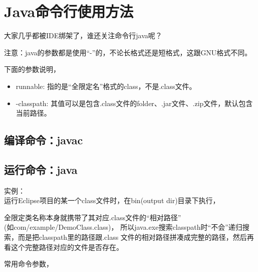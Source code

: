 ﻿\section[Java命令行使用方法]{Java命令行使用方法}
大家几乎都被IDE绑架了，谁还关注命令行java呢？\par
注意：java的参数都是使用“-”的，不论长格式还是短格式，这跟GNU格式不同。

下面的参数说明，
\begin{itemize}
  \item runnable: 指的是“全限定名”格式的class，不是.class文件。
  \item -classpath: 其值可以是包含.class文件的folder、.jar文件、.zip文件，默认包含当前路径。
\end{itemize}


\subsection[编译命令：javac]{编译命令：javac}

\subsection[运行命令：java]{运行命令：java}

实例：\\
运行Eclipse项目的某一个class文件时，在bin(output dir)目录下执行，

全限定类名称本身就携带了其对应.class文件的“相对路径”\\(如com/example/DemoClass.class)，
所以java.exe搜索classpath时“不会”递归搜索，而是把classpath里的路径跟.class
文件的相对路径拼凑成完整的路径，然后再看这个完整路径对应的文件是否存在。

常用命令参数，

